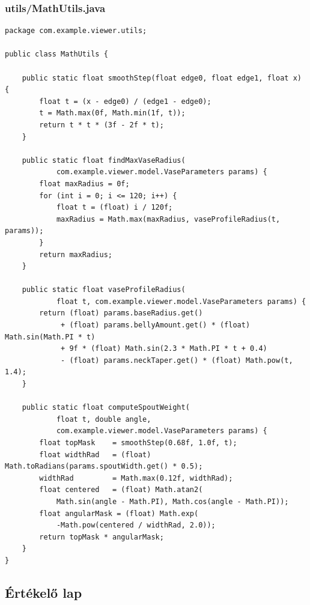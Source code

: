 \documentclass[12pt,a4paper]{article}
\begin{document}
\subsubsection*{utils/MathUtils.java}

\begin{lstlisting}[style=java, caption={MathUtils.java -- matematikai segédfüggvények}]
package com.example.viewer.utils;

public class MathUtils {

    public static float smoothStep(float edge0, float edge1, float x) {
        float t = (x - edge0) / (edge1 - edge0);
        t = Math.max(0f, Math.min(1f, t));
        return t * t * (3f - 2f * t);
    }

    public static float findMaxVaseRadius(
            com.example.viewer.model.VaseParameters params) {
        float maxRadius = 0f;
        for (int i = 0; i <= 120; i++) {
            float t = (float) i / 120f;
            maxRadius = Math.max(maxRadius, vaseProfileRadius(t, params));
        }
        return maxRadius;
    }

    public static float vaseProfileRadius(
            float t, com.example.viewer.model.VaseParameters params) {
        return (float) params.baseRadius.get()
             + (float) params.bellyAmount.get() * (float) Math.sin(Math.PI * t)
             + 9f * (float) Math.sin(2.3 * Math.PI * t + 0.4)
             - (float) params.neckTaper.get() * (float) Math.pow(t, 1.4);
    }

    public static float computeSpoutWeight(
            float t, double angle,
            com.example.viewer.model.VaseParameters params) {
        float topMask    = smoothStep(0.68f, 1.0f, t);
        float widthRad   = (float) Math.toRadians(params.spoutWidth.get() * 0.5);
        widthRad         = Math.max(0.12f, widthRad);
        float centered   = (float) Math.atan2(
            Math.sin(angle - Math.PI), Math.cos(angle - Math.PI));
        float angularMask = (float) Math.exp(
            -Math.pow(centered / widthRad, 2.0));
        return topMask * angularMask;
    }
}
\end{lstlisting}

\subsection{Értékelő lap}
\end{document}
